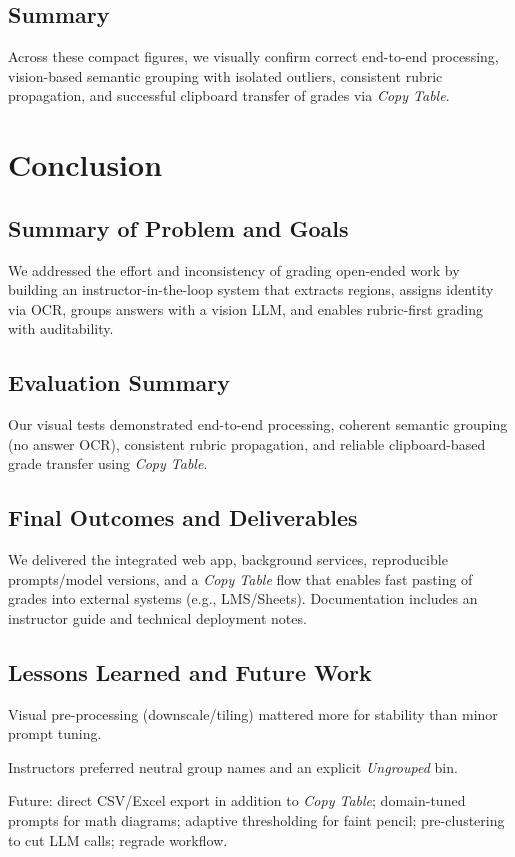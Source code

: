 \documentclass[ms,twoside,print]{nuthesis}
\begin{document}
\section{Summary}
Across these compact figures, we visually confirm correct end-to-end processing,
vision-based semantic grouping with isolated outliers,
consistent rubric propagation, and successful clipboard transfer of grades via \emph{Copy Table}.



\chapter{Conclusion}
\section{Summary of Problem and Goals}
We addressed the effort and inconsistency of grading open-ended work by building an instructor-in-the-loop system that extracts regions, assigns identity via OCR, groups answers with a vision LLM, and enables rubric-first grading with auditability.

\section{Evaluation Summary}
Our visual tests demonstrated end-to-end processing, coherent semantic grouping (no answer OCR), consistent rubric propagation, and reliable clipboard-based grade transfer using \emph{Copy Table}.

\section{Final Outcomes and Deliverables}
We delivered the integrated web app, background services, reproducible prompts/model versions, and a \emph{Copy Table} flow that enables fast pasting of grades into external systems (e.g., LMS/Sheets). Documentation includes an instructor guide and technical deployment notes.

\section{Lessons Learned and Future Work}
\begin{compactitem}
  \item Visual pre-processing (downscale/tiling) mattered more for stability than minor prompt tuning.
  \item Instructors preferred neutral group names and an explicit \emph{Ungrouped} bin.
  \item Future: direct CSV/Excel export in addition to \emph{Copy Table}; domain-tuned prompts for math diagrams; adaptive thresholding for faint pencil; pre-clustering to cut LLM calls; regrade workflow.
\end{compactitem}
\end{document}
